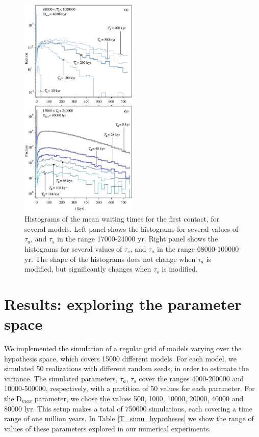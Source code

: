 \documentclass[crop]{CSLB}%
\begin{document}
\begin{figure}
   \centering
   \includegraphics[width=0.5\textwidth]{waiting_s+a_dif_ylog.pdf}
   \caption{Histograms of the mean waiting times for the first contact, for
   several models.
   Left panel shows the histograms for several values of $\tau_a$, and
   $\tau_s$ in the range 17000-24000 yr.
   Right panel shows the histograms for several values of $\tau_s$, and
   $\tau_a$ in the range 68000-100000 yr.
   The shape of the histograms does not change when $\tau_a$ is
   modified, but significantly changes when $\tau_s$ is modified.
   }
   \label{F_waiting_for_1C}
\end{figure}

                       

\section{Results: exploring the parameter space}\label{S_results}

We implemented the simulation of a regular grid of models varying over
the hypothesis space, which covers 15000 different models.
%
For each model, we simulated 50 realizations with different random
seeds, in order to estimate the variance.
%
The simulated parameters, $\tau_a$, $\tau_s$ cover the ranges
4000-200000 and 10000-500000, respectively, with a partition of 50
values for each parameter.
%
For the D$_{max}$ parameter, we chose the values 500, 1000, 10000,
20000, 40000 and 80000 lyr.
%
This setup makes a total of 750000 simulations, each covering a time
range of one million years.
%
In Table \ref{T_simu_hypotheses} we show the range of values of these parameters explored 
in our numerical experiments.
\end{document}
